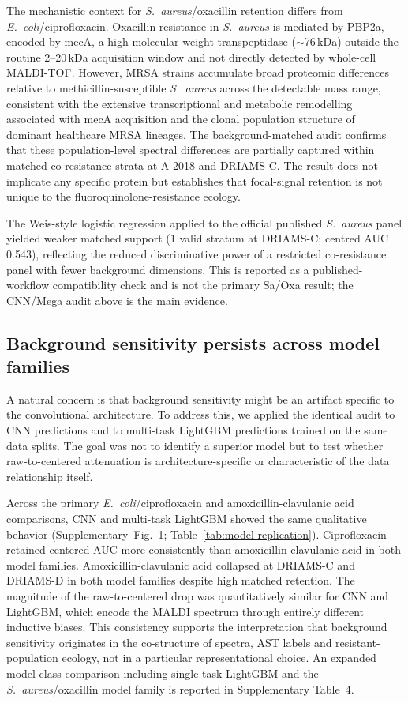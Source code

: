 \documentclass[11pt]{article}
\begin{document}
The mechanistic context for \textit{S.~aureus}/oxacillin retention differs from \textit{E.~coli}/ciprofloxacin. Oxacillin resistance in \textit{S.~aureus} is mediated by PBP2a, encoded by mecA, a high-molecular-weight transpeptidase ($\sim$76\,kDa) outside the routine 2--20\,kDa acquisition window and not directly detected by whole-cell MALDI-TOF. However, MRSA strains accumulate broad proteomic differences relative to methicillin-susceptible \textit{S.~aureus} across the detectable mass range, consistent with the extensive transcriptional and metabolic remodelling associated with mecA acquisition and the clonal population structure of dominant healthcare MRSA lineages. The background-matched audit confirms that these population-level spectral differences are partially captured within matched co-resistance strata at A-2018 and DRIAMS-C. The result does not implicate any specific protein but establishes that focal-signal retention is not unique to the fluoroquinolone-resistance ecology.

The Weis-style logistic regression applied to the official published \textit{S.~aureus} panel yielded weaker matched support (1 valid stratum at DRIAMS-C; centred AUC 0.543), reflecting the reduced discriminative power of a restricted co-resistance panel with fewer background dimensions. This is reported as a published-workflow compatibility check and is not the primary Sa/Oxa result; the CNN/Mega audit above is the main evidence.

\subsection*{Background sensitivity persists across model families}

A natural concern is that background sensitivity might be an artifact specific to the convolutional architecture. To address this, we applied the identical audit to CNN predictions and to multi-task LightGBM predictions trained on the same data splits. The goal was not to identify a superior model but to test whether raw-to-centered attenuation is architecture-specific or characteristic of the data relationship itself.

Across the primary \textit{E.~coli}/ciprofloxacin and amoxicillin-clavulanic acid comparisons, CNN and multi-task LightGBM showed the same qualitative behavior (Supplementary~Fig.~1; Table~\ref{tab:model-replication}). Ciprofloxacin retained centered AUC more consistently than amoxicillin-clavulanic acid in both model families. Amoxicillin-clavulanic acid collapsed at DRIAMS-C and DRIAMS-D in both model families despite high matched retention. The magnitude of the raw-to-centered drop was quantitatively similar for CNN and LightGBM, which encode the MALDI spectrum through entirely different inductive biases. This consistency supports the interpretation that background sensitivity originates in the co-structure of spectra, AST labels and resistant-population ecology, not in a particular representational choice. An expanded model-class comparison including single-task LightGBM and the \textit{S.~aureus}/oxacillin model family is reported in Supplementary Table~4.
\end{document}
